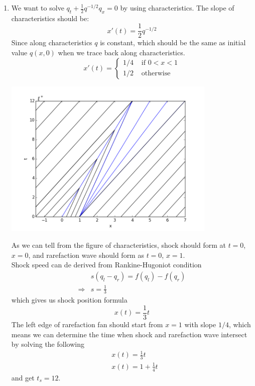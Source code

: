 \documentclass[11pt]{article}
\begin{document}
\begin{enumerate}
\begin{enumerate}
            \end{enumerate}

		
		\vskip 5pt
        \vskip 5pt
        
			\begin{enumerate}
				
				\item
					We want to solve $q_t+\frac{1}{2}q^{-1/2}q_x=0$ by using characteristics. The slope of characteristics should be:
					\[
					x'(t)=\frac{1}{2}q^{-1/2}
					\]
					Since along characteristics $q$ is constant, which should be the same as initial value $q(x,0)$ when we trace back along characteristics.
					\[
					x'(t)=\begin{cases}1/4  &\text{  if } 0<x<1 \\
					1/2 &\text{  otherwise}\end{cases}
					\]	
					
					\hfil\includegraphics[width=4.0in]{problem_1a_char.png}\hfill

					As we can tell from the figure of characteristics, shock should form at $t=0$, $x=0$, and rarefaction wave should form as $t=0$, $x=1$.\\
					
					Shock speed can de derived from Rankine-Hugoniot condition
					\begin{align*}
					&s(q_l-q_r)=f(q_l)-f(q_r)\\
					\Rightarrow &s=\frac{1}{3}
					\end{align*}
					which gives us shock position formula
					\[
					x(t)=\frac{1}{3}t
					\]			
					The left edge of rarefaction fan should start from $x=1$ with slope $1/4$, which means we can determine the time when shock and rarefaction wave intersect by solving the following 
					\begin{align*}
					&x(t)=\frac{1}{3}t\\
					&x(t)=1+\frac{1}{4}t
					\end{align*}
					and get $t_s=12$.\\
					

\end{enumerate}
\end{enumerate}
\end{document}
